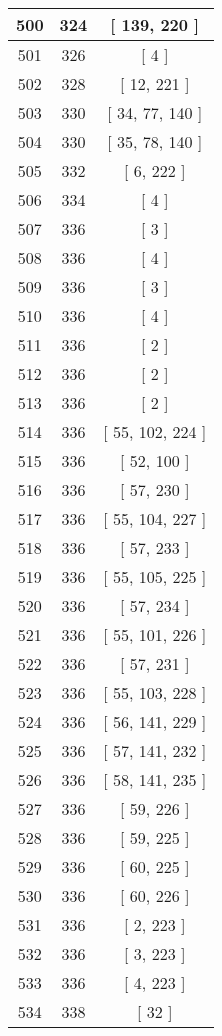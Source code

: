 \begin{center}
\begin{longtable}[H]{|| c c c ||}
\hline
500 & 324 & [ 139, 220 ] \\ 
\hline
501 & 326 & [ 4 ] \\ 
\hline
502 & 328 & [ 12, 221 ] \\ 
\hline
503 & 330 & [ 34, 77, 140 ] \\ 
\hline
504 & 330 & [ 35, 78, 140 ] \\ 
\hline
505 & 332 & [ 6, 222 ] \\ 
\hline
506 & 334 & [ 4 ] \\ 
\hline
507 & 336 & [ 3 ] \\ 
\hline
508 & 336 & [ 4 ] \\ 
\hline
509 & 336 & [ 3 ] \\ 
\hline
510 & 336 & [ 4 ] \\ 
\hline
511 & 336 & [ 2 ] \\ 
\hline
512 & 336 & [ 2 ] \\ 
\hline
513 & 336 & [ 2 ] \\ 
\hline
514 & 336 & [ 55, 102, 224 ] \\ 
\hline
515 & 336 & [ 52, 100 ] \\ 
\hline
516 & 336 & [ 57, 230 ] \\ 
\hline
517 & 336 & [ 55, 104, 227 ] \\ 
\hline
518 & 336 & [ 57, 233 ] \\ 
\hline
519 & 336 & [ 55, 105, 225 ] \\ 
\hline
520 & 336 & [ 57, 234 ] \\ 
\hline
521 & 336 & [ 55, 101, 226 ] \\ 
\hline
522 & 336 & [ 57, 231 ] \\ 
\hline
523 & 336 & [ 55, 103, 228 ] \\ 
\hline
524 & 336 & [ 56, 141, 229 ] \\ 
\hline
525 & 336 & [ 57, 141, 232 ] \\ 
\hline
526 & 336 & [ 58, 141, 235 ] \\ 
\hline
527 & 336 & [ 59, 226 ] \\ 
\hline
528 & 336 & [ 59, 225 ] \\ 
\hline
529 & 336 & [ 60, 225 ] \\ 
\hline
530 & 336 & [ 60, 226 ] \\ 
\hline
531 & 336 & [ 2, 223 ] \\ 
\hline
532 & 336 & [ 3, 223 ] \\ 
\hline
533 & 336 & [ 4, 223 ] \\ 
\hline
534 & 338 & [ 32 ] \\ 

\end{longtable}
\end{center}
